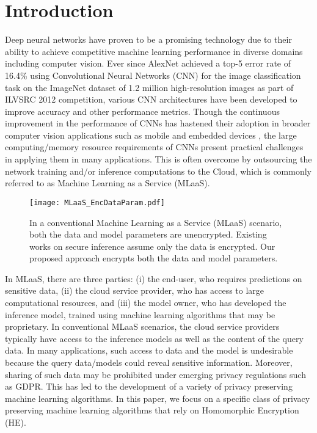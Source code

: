 \documentclass[letterpaper]{article} %
\begin{document}
\section{Introduction}

Deep neural networks have proven to be a promising technology due to their ability to achieve competitive machine learning performance in diverse domains including computer vision. Ever since AlexNet achieved a top-5 error rate of 16.4\% using Convolutional Neural Networks (CNN) for the image classification task on the ImageNet dataset of 1.2 million high-resolution images as part of ILVSRC 2012 \cite{NIPS2012_4824} competition, various CNN architectures \cite{vggnet}\cite{googlenet}\cite{zfnet} have been developed to improve accuracy and other performance metrics. Though the continuous improvement in the performance of CNNs has hastened their adoption in broader computer vision applications such as mobile and embedded devices \cite{DBLP:journals/corr/HowardZCKWWAA17}\cite{Phan_2020_WACV}, the large computing/memory resource requirements of CNNs present practical challenges in applying them in many applications. This is often overcome by outsourcing the network training and/or inference computations to the Cloud, which is commonly referred to as Machine Learning as a Service (MLaaS).

\begin{figure}
\begin{center}
\texttt{[image: MLaaS\_EncDataParam.pdf]}
\end{center}
\caption{In a conventional Machine Learning as a Service (MLaaS) scenario, both the data and model parameters are unencrypted. Existing works on secure inference assume only the data is encrypted. Our proposed approach encrypts both the data and model parameters.}
\label{fig:MLaaS}
\end{figure}

In MLaaS, there are three parties: (i) the end-user, who requires predictions on sensitive data, (ii) the cloud service provider, who has access to large computational resources, and (iii) the model owner, who has developed the inference model, trained using machine learning algorithms that may be proprietary. In conventional MLaaS scenarios, the cloud service providers typically have access to the inference models as well as the content of the query data. In many applications, such access to data and the model is undesirable because the query data/models could reveal sensitive information. Moreover, sharing of such data may be prohibited under emerging privacy regulations such as GDPR.  This has led to the development of a variety of privacy preserving machine learning algorithms. In this paper, we focus on a specific class of privacy preserving machine learning algorithms that rely on Homomorphic Encryption (HE).
\end{document}
